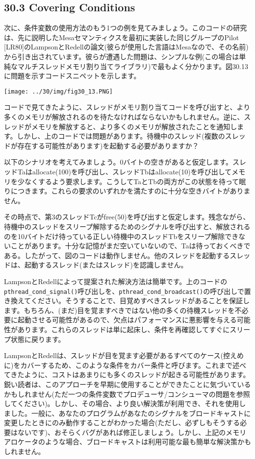 \hypertarget{covering-conditions}{%
\subsection*{30.3 Covering Conditions}\label{covering-conditions}}

次に、条件変数の使用方法のもう1つの例を見てみましょう。このコードの研究は、先に説明したMesaセマンティクスを最初に実装した同じグループのPilot
{[}LR80{]}のLampsonとRedellの論文(彼らが使用した言語はMesaなので、その名前)から引き出されています。彼らが遭遇した問題は、シンプルな例(この場合は単純なマルチスレッドメモリ割り当てライブラリ)で最もよく分かります。図30.13に問題を示すコードスニペットを示します。

\texttt{[image: ../30/img/fig30\_13.PNG]}

コードで見てきたように、スレッドがメモリ割り当てコードを呼び出すと、より多くのメモリが解放されるのを待たなければならないかもしれません。逆に、スレッドがメモリを解放すると、より多くのメモリが解放されたことを通知します。しかし、上のコードでは問題があります。待機中のスレッド(複数のスレッドが存在する可能性があります)を起動する必要がありますか？

以下のシナリオを考えてみましょう。0バイトの空きがあると仮定します。スレッドTaはallocate(100)を呼び出し、スレッドTbはallocate(10)を呼び出してメモリを少なくするよう要求します。こうしてTaとTbの両方がこの状態を待って眠りにつきます。これらの要求のいずれかを満たすのに十分な空きバイトがありません。

その時点で、第3のスレッドTcがfree(50)を呼び出すと仮定します。残念ながら、待機中のスレッドをスリープ解除するためのシグナルを呼び出すと、解放されるのを10バイトだけ待っている正しい待機中のスレッドTbをスリープ解除できないことがあります。十分な記憶がまだ空いていないので、Taは待っておくべきである。したがって、図のコードは動作しません。他のスレッドを起動するスレッドは、起動するスレッド(またはスレッド)を認識しません。

LampsonとRedellによって提案された解決方法は簡単です。上のコードの\texttt{pthread\_cond\_signal()}呼び出しを、\texttt{pthread\_cond\_broadcast()}の呼び出しで置き換えてください。そうすることで、目覚めすべきスレッドがあることを保証します。もちろん、(まだ)目を覚ますべきではない他の多くの待機スレッドを不必要に起動させる可能性があるので、欠点はパフォーマンスに悪影響を与える可能性があります。これらのスレッドは単に起床し、条件を再確認してすぐにスリープ状態に戻ります。

LampsonとRedellは、スレッドが目を覚ます必要があるすべてのケース(控えめに)をカバーするため、このような条件をカバー条件と呼びます。これまで述べてきたように、コストはあまりにも多くのスレッドが起きる可能性があります。鋭い読者は、このアプローチを早期に使用することができたことに気づいているかもしれません(ただ一つの条件変数でプロデューサ/コンシューマの問題を参照してください)。しかし、その場合、より良い解決策が利用でき、それを使用しました。一般に、あなたのプログラムがあなたのシグナルをブロードキャストに変更したときにのみ動作することがわかった場合(ただし、必ずしもそうする必要はないです)、おそらくバグがあれば修正しましょう。しかし、上記のメモリアロケータのような場合、ブロードキャストは利用可能な最も簡単な解決策かもしれません。

